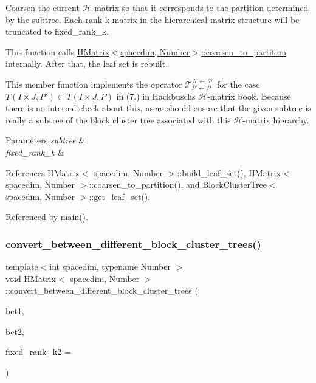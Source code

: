Coarsen the current $\mathcal{H}$-\/matrix so that it corresponds to the partition determined by the {\ttfamily subtree}. Each rank-\/k matrix in the hierarchical matrix structure will be truncated to {\ttfamily fixed\+\_\+rank\+\_\+k}.

This function calls {\ttfamily \hyperlink{classHMatrix_a525ad4d453f4f496b98cccb341c8b60b}{H\+Matrix$<$spacedim, Number$>$\+::coarsen\+\_\+to\+\_\+partition}} internally. After that, the leaf set is rebuilt.

This member function implements the operator $\mathcal{T}_{P' \leftarrow P}^{\mathcal{H} \leftarrow \mathcal{H}}$ for the case $T(I \times J, P') \subset T(I \times J, P)$ in (7.) in Hackbusch\textquotesingle{}s $\mathcal{H}$-\/matrix book. Because there is no internal check about this, users should ensure that the given {\ttfamily subtree} is really a subtree of the block cluster tree associated with this $\mathcal{H}$-\/matrix hierarchy.


\begin{DoxyParams}{Parameters}
{\em subtree} & \\
\hline
{\em fixed\+\_\+rank\+\_\+k} & \\
\hline
\end{DoxyParams}


References H\+Matrix$<$ spacedim, Number $>$\+::build\+\_\+leaf\+\_\+set(), H\+Matrix$<$ spacedim, Number $>$\+::coarsen\+\_\+to\+\_\+partition(), and Block\+Cluster\+Tree$<$ spacedim, Number $>$\+::get\+\_\+leaf\+\_\+set().



Referenced by main().

\mbox{\label{classHMatrix_af6fd60090b0de7bdea52fc84ddeb22c3}} 
\subsubsection{\texorpdfstring{convert\+\_\+between\+\_\+different\+\_\+block\+\_\+cluster\+\_\+trees()}{convert\_between\_different\_block\_cluster\_trees()}}
{\footnotesize\ttfamily template$<$int spacedim, typename Number $>$ \\
void \hyperlink{classHMatrix}{H\+Matrix}$<$ spacedim, Number $>$\+::convert\+\_\+between\+\_\+different\+\_\+block\+\_\+cluster\+\_\+trees (\begin{DoxyParamCaption}\item[{\hyperlink{classBlockClusterTree}{Block\+Cluster\+Tree}$<$ spacedim, Number $>$ \&}]{bct1,  }\item[{\hyperlink{classBlockClusterTree}{Block\+Cluster\+Tree}$<$ spacedim, Number $>$ \&}]{bct2,  }\item[{const unsigned int}]{fixed\+\_\+rank\+\_\+k2 = {} }\end{DoxyParamCaption})}

